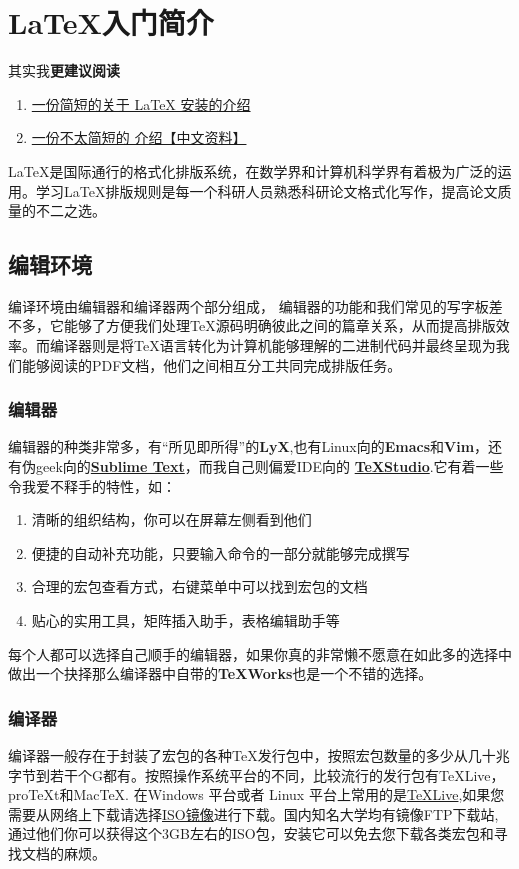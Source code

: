 \section{\LaTeX 入门简介}

其实我\textbf{更建议阅读}
\begin{enumerate}
	\item \textcolor{blue}{ \href{https://github.com/OsbertWang/install-latex}{一份简短的关于 LaTeX 安装的介绍}}

	\item \textcolor{blue}{ \href{http://mirrors.ctan.org/info/lshort/chinese/lshort-zh-cn.pdf}{一份不太简短的 \LaTeXe 介绍【中文资料】}}
\end{enumerate}

\LaTeX 是国际通行的格式化排版系统，在数学界和计算机科学界有着极为广泛的运用。学习\LaTeX 排版规则是每一个科研人员熟悉科研论文格式化写作，提高论文质量的不二之选。
\subsection{编辑环境}
编译环境由编辑器和编译器两个部分组成， 编辑器的功能和我们常见的写字板差不多，它能够了方便我们处理\TeX 源码明确彼此之间的篇章关系，从而提高排版效率。而编译器则是将\TeX 语言转化为计算机能够理解的二进制代码并最终呈现为我们能够阅读的PDF文档，他们之间相互分工共同完成排版任务。
\subsubsection{编辑器}
编辑器的种类非常多，有“所见即所得”的\textbf{LyX},也有Linux向的\textbf{Emacs}和\textbf{Vim}，还有伪geek向的\href{http://www.sublimetext.com/}{\textbf{Sublime Text}}，而我自己则偏爱IDE向的
\href{http://texstudio.sourceforge.net/}{\textbf{\TeX Studio}}.它有着一些令我爱不释手的特性，如：
\begin{enumerate}
	\item 清晰的组织结构，你可以在屏幕左侧看到他们
	\item 便捷的自动补充功能，只要输入命令的一部分就能够完成撰写
	\item 合理的宏包查看方式，右键菜单中可以找到宏包的文档
	\item 贴心的实用工具，矩阵插入助手，表格编辑助手等
\end{enumerate}

每个人都可以选择自己顺手的编辑器，如果你真的非常懒不愿意在如此多的选择中做出一个抉择那么编译器中自带的\textbf{\TeX Works}也是一个不错的选择。
\subsubsection{编译器}
编译器一般存在于封装了宏包的各种\TeX 发行包中，按照宏包数量的多少从几十兆字节到若干个G都有。按照操作系统平台的不同，比较流行的发行包有\TeX Live，pro\TeX t和Mac\TeX . 在Windows 平台或者 Linux 平台上常用的是\href{https://www.tug.org/texlive/}{\TeX Live},如果您需要从网络上下载请选择\href{https://www.tug.org/texlive/acquire-iso.html}{ISO镜像}进行下载。国内知名大学均有镜像FTP下载站,通过他们你可以获得这个3GB左右的ISO包，安装它可以免去您下载各类宏包和寻找文档的麻烦。
